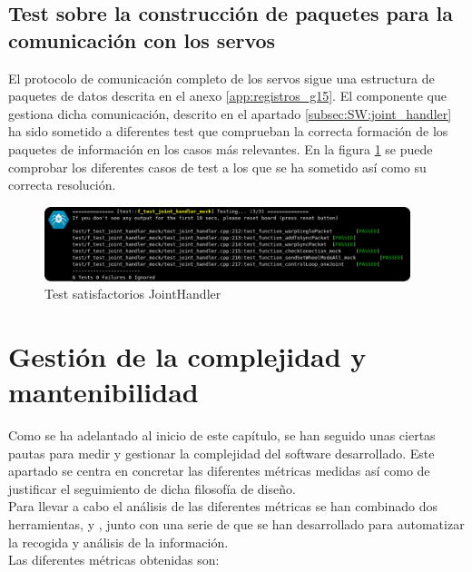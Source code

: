     \subsection{Test sobre la construcción de paquetes para la comunicación con los servos}
        El protocolo de comunicación completo de los servos sigue una estructura de paquetes de datos descrita en el anexo \ref{app:registros_g15}. El componente que gestiona dicha comunicación, descrito en el apartado \ref{subsec:SW:joint_handler} ha sido sometido a diferentes test que comprueban la correcta formación de los paquetes de información en los casos más relevantes. En la figura \ref{fig:SW:test:joint_handler_ok} se puede comprobar los diferentes casos de test a los que se ha sometido así como su correcta resolución.
        \begin{figure}[H]
            \centering
            \includegraphics[width=0.95\textwidth]{figuras/Imagenes_SW/test/SWTest_5.jpg}
            \caption{Test satisfactorios JointHandler}
            \label{fig:SW:test:joint_handler_ok}
        \end{figure}

\section{Gestión de la complejidad y mantenibilidad} \label{sec:SW:gestion_complejidad}
    Como se ha adelantado al inicio de este capítulo, se han seguido unas ciertas pautas para medir y gestionar la complejidad del software desarrollado. Este apartado se centra en concretar las diferentes métricas medidas así como de justificar el seguimiento de dicha filosofía de diseño.
    \\
    
    Para llevar a cabo el análisis de las diferentes métricas se han combinado dos herramientas,  y , junto con una serie de  que se han desarrollado para automatizar la recogida y análisis de la información.
    \\
    
    Las diferentes métricas obtenidas son:

